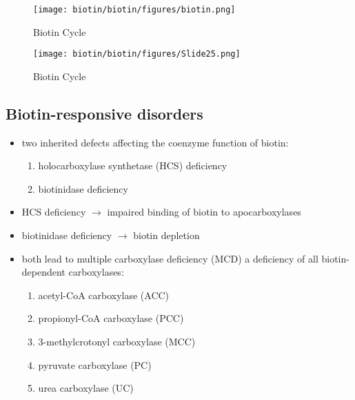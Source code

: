 \documentclass{scrartcl}
\begin{document}
\begin{figure}[htbp]
\centering
\texttt{[image: biotin/biotin/figures/biotin.png]}
\caption{\label{fig:org68f8393}Biotin Cycle}
\end{figure}

\begin{figure}[htbp]
\centering
\texttt{[image: biotin/biotin/figures/Slide25.png]}
\caption{\label{fig:org0d957b1}Biotin Cycle}
\end{figure}

\subsection{Biotin-responsive disorders}
\label{sec:org1435006}
\begin{itemize}
\item two inherited defects affecting the coenzyme function of biotin:
\begin{enumerate}
\item holocarboxylase synthetase (HCS) deficiency
\item biotinidase deficiency
\end{enumerate}
\item HCS deficiency \(\to\) impaired binding of biotin to apocarboxylases
\item biotinidase deficiency \(\to\) biotin depletion
\item both lead to multiple carboxylase deficiency (MCD) a deficiency of
all biotin-dependent carboxylases:
\begin{enumerate}
\item acetyl-CoA carboxylase (ACC)
\item propionyl-CoA carboxylase (PCC)
\item 3-methylcrotonyl carboxylase (MCC)
\item pyruvate carboxylase (PC)
\item urea carboxylase (UC)
\end{enumerate}
\end{itemize}
\end{document}
